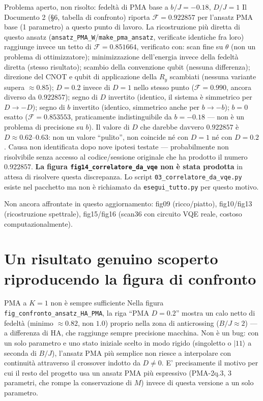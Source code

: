\documentclass[11pt,a4paper]{article}
\newcommand{\ket}[1]{\lvert #1 \rangle}
\newcommand{\code}[1]{\texttt{\small #1}}
\begin{document}
\begin{warnbox}{Problema aperto, non risolto: fedeltà di PMA base a
$b/J=-0.18$, $D/J=1$}
Il Documento 2 (\S6, tabella di confronto) riporta $\mathcal F=0.922857$
per l'ansatz PMA base (1 parametro) a questo punto di lavoro. La
ricostruzione più diretta di questo ansatz
(\code{ansatz\_PMA\_W}/\code{make\_pma\_ansatz}, verificate identiche
fra loro) raggiunge invece un tetto di $\mathcal F=0.851664$, verificato
con: scan fine su $\theta$ (non un problema di ottimizzatore); minimizzazione
dell'energia invece della fedeltà diretta (stesso risultato); scambio
della convenzione qubit (nessuna differenza); direzione del CNOT e
qubit di applicazione della $R_y$ scambiati (nessuna variante supera
$\approx0.85$); $D=0.2$ invece di $D=1$ nello stesso punto ($\mathcal
F=0.990$, ancora diverso da $0.922857$); segno di $D$ invertito
(identico, il sistema è simmetrico per $D\to-D$); segno di $b$
invertito (identico, simmetrico anche per $b\to-b$); $b=0$ esatto
($\mathcal F=0.853553$, praticamente indistinguibile da $b=-0.18$ ---
non è un problema di precisione su $b$). Il valore di $D$ che
darebbe davvero $0.922857$ è $D\approx0.62$--$0.63$: non un valore
``pulito'', non coincide né con $D=1$ né con $D=0.2$. Causa non
identificata dopo nove ipotesi testate --- probabilmente non
risolvibile senza accesso al codice/sessione originale che ha prodotto
il numero $0.922857$. \textbf{La figura \code{fig14\_correlatore\_da\_vqe}
non è stata prodotta} in attesa di risolvere questa discrepanza. Lo
script \code{03\_correlatore\_da\_vqe.py} esiste nel pacchetto ma non è
richiamato da \code{esegui\_tutto.py} per questo motivo.
\end{warnbox}

Non ancora affrontate in questo aggiornamento: fig09 (ricco/piatto),
fig10/fig13 (ricostruzione spettrale), fig15/fig16 (scan36 con circuito
VQE reale, costoso computazionalmente).

\section{Un risultato genuino scoperto riproducendo la figura di confronto}
\label{sec:pma-k1}

\begin{warnbox}{PMA a $K=1$ non è sempre sufficiente}
Nella figura \code{fig\_confronto\_ansatz\_HA\_PMA}, la riga ``PMA
$D=0.2$'' mostra un calo netto di fedeltà (minimo $\approx0.82$, non
$1.0$) proprio nella zona di anticrossing ($B/J\approx2$) --- a
differenza di HA, che raggiunge sempre precisione macchina. Non è un
bug: con un solo parametro e uno stato iniziale scelto in modo rigido
(singoletto o $\ket{11}$ a seconda di $B/J$), l'ansatz PMA più semplice
non riesce a interpolare con continuità attraverso il crossover indotto
da $D\neq0$. E' precisamente il motivo per cui il resto del progetto usa
un ansatz PMA più espressivo (PMA-2q.3, 3 parametri, che rompe la
conservazione di $M$) invece di questa versione a un solo parametro.
\end{warnbox}
\end{document}
